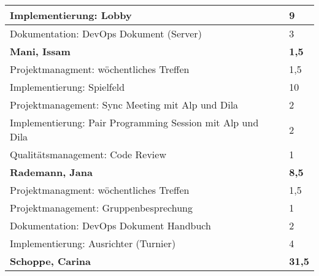 \documentclass[a4paper,11pt]{scrartcl}
\begin{document}
\begin{longtable}{| p{13.8cm} | C{2.4cm} |}
	Implementierung: Lobby
	&
  9
	\\
	\hline

  Dokumentation: DevOps Dokument (Server)
	&
  3
	\\
	\hline


	\textbf{Mani, Issam} & \textbf{1,5}\\ %
	\hline

  Projektmanagment: wöchentliches Treffen
	&
  1,5
	\\
	\hline
	
  Implementierung: Spielfeld
	&
  10
	\\
	\hline
	
  Projektmanagement: Sync Meeting mit Alp und Dila
	&
  2
	\\
	\hline
	
  Implementierung: Pair Programming Session mit Alp und Dila
	&
  2
	\\
	\hline
	
  Qualitätsmanagement: Code Review
	&
  1
	\\
	\hline
	\hline


	\textbf{Rademann, Jana} & \textbf{8,5}\\ %
	\hline

  Projektmanagment: wöchentliches Treffen
	&
  1,5
	\\
	\hline

  Projektmanagement: Gruppenbesprechung
	&
  1
	\\
	\hline

  Dokumentation: DevOps Dokument Handbuch
	&
  2
	\\
	\hline

  Implementierung: Ausrichter (Turnier)
	&
  4
	\\
	\hline
	\hline


	\textbf{Schoppe, Carina} & \textbf{31,5}\\ %
	\hline


\end{longtable}
\end{document}
